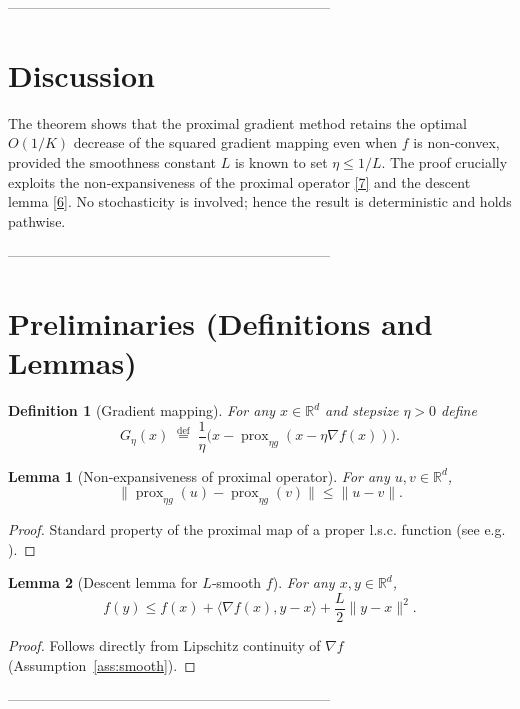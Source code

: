 \documentclass{article}
\newtheorem{lemma}{Lemma}
\newtheorem{definition}{Definition}
\begin{document}
---------------------------------------------------------------------

\section*{Discussion}
The theorem shows that the proximal gradient method retains the optimal $O(1/K)$ decrease of the squared gradient mapping even when $f$ is non‑convex, provided the smoothness constant $L$ is known to set $\eta\le1/L$. The proof crucially exploits the non‑expansiveness of the proximal operator \eqref{7} and the descent lemma \eqref{6}. No stochasticity is involved; hence the result is deterministic and holds pathwise.

---------------------------------------------------------------------

\section*{Preliminaries (Definitions and Lemmas)}
\begin{definition}[Gradient mapping]
For any $x\in\mathbb{R}^d$ and stepsize $\eta>0$ define
\[
G_{\eta}(x)\;\stackrel{\text{def}}{=}\;\frac{1}{\eta}\bigl(x-\operatorname{prox}_{\eta g}(x-\eta\nabla f(x))\bigr).
\tag{12}
\]
\end{definition}

\begin{lemma}[Non‑expansiveness of proximal operator]\label{lem:nonexp}
For any $u,v\in\mathbb{R}^d$,
\[
\bigl\|\operatorname{prox}_{\eta g}(u)-\operatorname{prox}_{\eta g}(v)\bigr\|
\le\|u-v\|.
\tag{13}
\]
\end{lemma}
\begin{proof}
Standard property of the proximal map of a proper l.s.c. function (see e.g. \cite{parikh2014proximal}). \qedhere
\end{proof}

\begin{lemma}[Descent lemma for $L$‑smooth $f$]\label{lem:descent}
For any $x,y\in\mathbb{R}^d$,
\[
f(y)\le f(x)+\langle\nabla f(x),y-x\rangle+\frac{L}{2}\|y-x\|^{2}.
\tag{14}
\]
\end{lemma}
\begin{proof}
Follows directly from Lipschitz continuity of $\nabla f$ (Assumption~\ref{ass:smooth}). \qedhere
\end{proof}

---------------------------------------------------------------------
\end{document}

